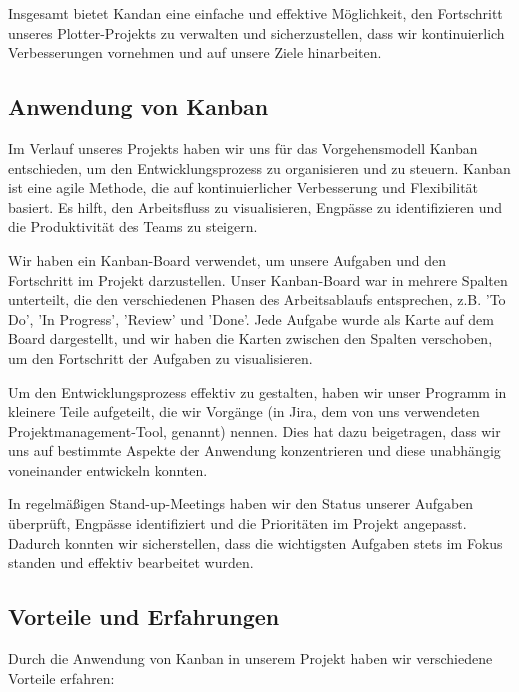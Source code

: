 \documentclass[a4paper]{article}
\begin{document}
Insgesamt bietet Kandan eine einfache und effektive Möglichkeit, den Fortschritt unseres Plotter-Projekts zu verwalten und sicherzustellen, dass wir kontinuierlich Verbesserungen vornehmen und auf unsere Ziele hinarbeiten.

\newpage

\subsection{Anwendung von Kanban}

Im Verlauf unseres Projekts haben wir uns für das Vorgehensmodell Kanban entschieden, um den Entwicklungsprozess zu organisieren und zu steuern. Kanban ist eine agile Methode, die auf kontinuierlicher Verbesserung und Flexibilität basiert. Es hilft, den Arbeitsfluss zu visualisieren, Engpässe zu identifizieren und die Produktivität des Teams zu steigern.

Wir haben ein Kanban-Board verwendet, um unsere Aufgaben und den Fortschritt im Projekt darzustellen. Unser Kanban-Board war in mehrere Spalten unterteilt, die den verschiedenen Phasen des Arbeitsablaufs entsprechen, z.B. 'To Do', 'In Progress', 'Review' und 'Done'. Jede Aufgabe wurde als Karte auf dem Board dargestellt, und wir haben die Karten zwischen den Spalten verschoben, um den Fortschritt der Aufgaben zu visualisieren.

Um den Entwicklungsprozess effektiv zu gestalten, haben wir unser Programm in kleinere Teile aufgeteilt, die wir Vorgänge (in Jira, dem von uns verwendeten Projektmanagement-Tool, genannt) nennen. Dies hat dazu beigetragen, dass wir uns auf bestimmte Aspekte der Anwendung konzentrieren und diese unabhängig voneinander entwickeln konnten.

In regelmäßigen Stand-up-Meetings haben wir den Status unserer Aufgaben überprüft, Engpässe identifiziert und die Prioritäten im Projekt angepasst. Dadurch konnten wir sicherstellen, dass die wichtigsten Aufgaben stets im Fokus standen und effektiv bearbeitet wurden.

\subsection{Vorteile und Erfahrungen}

Durch die Anwendung von Kanban in unserem Projekt haben wir verschiedene Vorteile erfahren:
\end{document}

